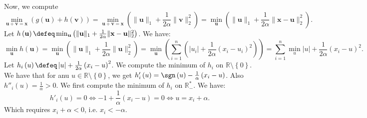 \documentclass{article}
\begin{document}
\begin{itemize}
           Now, we compute
           \begin{equation*}
               \min_{\mathbf{u} + \mathbf{v} = \mathbf{x}}
               \left(g\left(\mathbf{u}\right)
               + h\left(\mathbf{v}\right)\right)
               = \min_{\mathbf{u}+\mathbf{v} = \mathbf{x}}
               \left(\|\mathbf{u}\|_{1}
               + \frac{1}{2\alpha}\|\mathbf{v}\|_{2}^{2}\right)
               = \min_{\mathbf{u}}\left(\|\mathbf{u}\|_{1}
               + \frac{1}{2\alpha}\|\mathbf{x}
               - \mathbf{u}\|^{2}_{2}\right).
           \end{equation*}
           Let $h\left(\mathbf{u}\right)
           \defeq  \min_{\mathbf{u}}\left(\|\mathbf{u}\|_{1}
           + \frac{1}{2\alpha}\|\mathbf{x}
           - \mathbf{u}\|^{2}_{2}\right)$.
           We have:
           \begin{equation*}
               \min_{\mathbf{u}} h\left(\mathbf{u}\right)=
               \min_{\mathbf{u}}
               \left(\|\mathbf{u}\|_{1}
               + \frac{1}{2\alpha}\|\mathbf{u}\|_{2}^{2}\right)
               = \min_{\mathbf{u}}
               \left(
               \sum_{i=1}^{n} \left(
               \left|u_{i}\right| + 
               \frac{1}{2\alpha}
               \left(x_{i} - u_{i}\right)^{2}
               \right)
               \right) = 
               \sum_{i=1}^{n}
               \min_{u} \left|u\right| +
               \frac{1}{2\alpha} \left(x_{i} - u\right)^{2}.
           \end{equation*}
           Let $h_{i}\left(u\right) \defeq
           \left|u\right| + \frac{1}{2\alpha}
           \left(x_{i} - u\right)^{2}$.
           We compute the minimum of
           $h_{i}$ on $\mathbb{R} \setminus \left\{0\right\}$.
           We have that for anu $u \in \mathbb{R} \setminus \left\{0\right\}$,
           we get $h'_{i}\left(u\right) =
           \sgn\left(u\right) - \frac{1}{\alpha}
           \left(x_{i} - u\right)$.
           Also $h''_{i}\left(u\right) = \frac{1}{\alpha} > 0$.
           We first compute the minimum of $h_i$ on $\mathbb{R}_{-}^{*}$.
           We have:
           \begin{equation*}
               h'_{i} \left(u\right) = 0 \Longleftrightarrow 
               -1 + \frac{1}{\alpha} \left(x_{i} - u\right)=0
               \Longleftrightarrow u = x_{i} + \alpha.
           \end{equation*}
           Which requires $x_{i} + \alpha < 0$, i.e.
           $x_{i} < - \alpha$.
           

\end{itemize}
\end{document}
